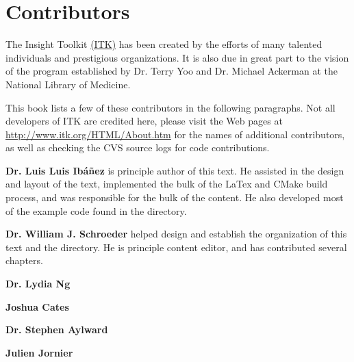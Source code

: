 \chapter*{Contributors}
\noindent

The Insight Toolkit \href{http://www.itk.org}{(ITK)} has been created by the
efforts of many talented individuals and prestigious organizations. It is also
due in great part to the vision of the program established by Dr. Terry Yoo
and Dr. Michael Ackerman at the National Library of Medicine.

This book lists a few of these contributors in the following paragraphs. Not
all developers of ITK are credited here, please visit the Web pages at
\href{http://www.itk.org/HTML/About.htm}{http://www.itk.org/HTML/About.htm} 
for the names of additional contributors, as well as checking the CVS source
logs for code contributions.

{\bf Dr. Luis Luis Ib\'{a}\~{n}ez} is principle author of this text.
He assisted in the design and layout of the text, implemented the bulk of
the LaTex and CMake build process, and was responsible for the bulk of 
the content. He also developed most of the example code found in the
 directory.

{\bf Dr. William J. Schroeder} helped design and establish the organization 
of this text and the  directory. He is principle 
content editor, and has contributed several chapters.

{\bf Dr. Lydia Ng}

{\bf Joshua Cates}

{\bf Dr. Stephen Aylward}

{\bf Julien Jornier}






